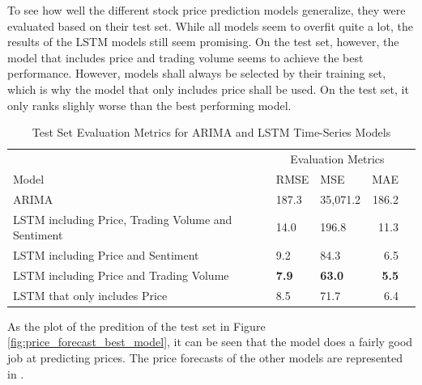 \documentclass[11pt, a4paper]{article}
\begin{document}
To see how well the different stock price prediction models generalize, they were evaluated based on their test set.
While all models seem to overfit quite a lot, the results of the LSTM models still seem promising. On the test set, however,
the model that includes price and trading volume seems to achieve the best performance. However, models shall always be selected
by their training set, which is why the model that only includes price shall be used. On the test set, it only ranks slighly worse
than the best performing model.

\begin{table}
    \caption{Test Set Evaluation Metrics for ARIMA and LSTM Time-Series Models}
    \label{tab:results_stocks}
    \centering
    \small

    \begin{tabular}{lllrr}
        \toprule
                                        & \multicolumn{3}{c}{Evaluation Metrics} \\
                                        \cmidrule{2-4}
                            Model       & RMSE      & MSE     & MAE    \\
            \midrule
            \multirow{1}{*}{ARIMA}         & 187.3          & 35,071.2          & 186.2 \\
            \midrule
            \multirow{1}{*}{LSTM including Price, Trading Volume and Sentiment}       & 14.0          & 196.8          & 11.3 \\
            \midrule
            \multirow{1}{*}{LSTM including Price and Sentiment}       & 9.2          & 84.3          & 6.5 \\
            \midrule
            \multirow{1}{*}{LSTM including Price and Trading Volume}      & \textbf{7.9}           & \textbf{63.0}          & \textbf{5.5} \\
            \midrule
            \multirow{1}{*}{LSTM that only includes Price}      & 8.5         & 71.7          & 6.4 \\

        \bottomrule
    \end{tabular}

\end{table}

As the plot of the predition of the test set in Figure \ref{fig:price_forecast_best_model}, it can be seen that the model does a fairly good job at predicting prices.
The price forecasts of the other models are represented in .
\end{document}
